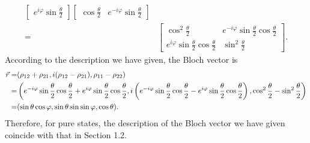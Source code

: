 \documentclass[en]{sol-man}
\begin{document}
\begin{sol}
\begin{align}
\begin{bmatrix}
            e^{i\varphi}\sin\frac{\theta}{2}
        \end{bmatrix}\begin{bmatrix}
            \cos\frac{\theta}{2}&e^{-i\varphi}\sin\frac{\theta}{2}
        \end{bmatrix}\\
        =&\begin{bmatrix}
            \cos^2\frac{\theta}{2}&e^{-i\varphi}\sin\frac{\theta}{2}\cos\frac{\theta}{2}\\
            e^{i\varphi}\sin\frac{\theta}{2}\cos\frac{\theta}{2}&\sin^2\frac{\theta}{2}
        \end{bmatrix}.
    \end{align}
    According to the description we have given, the Bloch vector is
    \begin{align}
        \notag\vec{r}=&(\rho_{12}+\rho_{21},i(\rho_{12}-\rho_{21}),\rho_{11}-\rho_{22})\\
        \notag=&\left(e^{-i\varphi}\sin\frac{\theta}{2}\cos\frac{\theta}{2}+e^{i\varphi}\sin\frac{\theta}{2}\cos\frac{\theta}{2},i\left(e^{-i\varphi}\sin\frac{\theta}{2}\cos\frac{\theta}{2}-e^{i\varphi}\sin\frac{\theta}{2}\cos\frac{\theta}{2}\right),\cos^2\frac{\theta}{2}-\sin^2\frac{\theta}{2}\right)\\
        =&(\sin\theta\cos\varphi,\sin\theta\sin\sin\varphi,\cos\theta).
    \end{align}
    Therefore, for pure states, the description of the Bloch vector we have given coincide with that in Section 1.2.
\end{sol}
\end{document}
